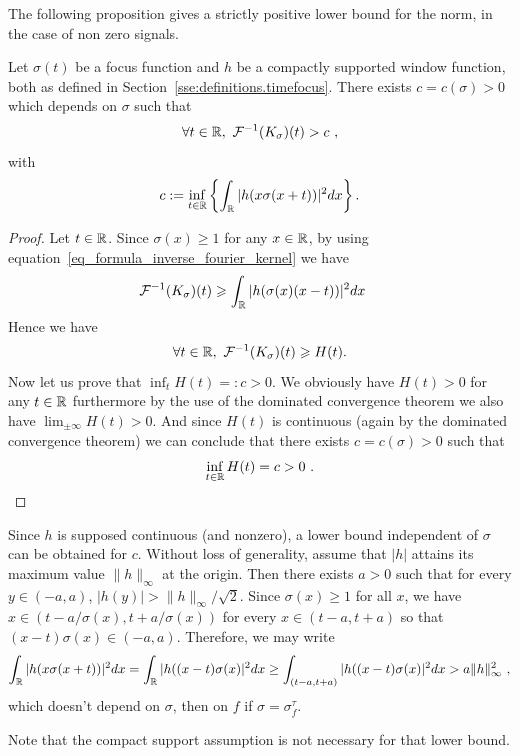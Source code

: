 The following proposition gives a strictly positive lower bound for the norm, in the case of non zero signals.
\begin{prop}\label{prop_lower_bound_control_time_variance}
	Let $\sigma(t)$ be a focus function and $h$ be a compactly supported window function, both as defined in Section~\ref{sse:definitions.timefocus}. There exists $c=c(\sigma)>0$ which depends on $\sigma$ such that
	\begin{equation}\label{eq_lower_bound_kernel}
		\forall t\in\mathbb{R}, \ \mathcal{F}^{-1}(K_\sigma)(t) > c\ ,
	\end{equation}
	with
    \begin{equation}
		c:= \inf_{t\in\mathbb{R}}\left\{ \int_{\mathbb{R}}|h(x\sigma(x+t))|^2 dx \right\} .
	\end{equation}
\end{prop}
\begin{proof}
Let $t\in\mathbb{R}$. Since $\sigma(x)\geqslant1$ for any $x\in\mathbb{R}$, by using equation~\eqref{eq_formula_inverse_fourier_kernel} we have
\begin{align*}
    \mathcal{F}^{-1}(K_\sigma)(t) & \geqslant \int_{\mathbb{R}} |h(\sigma(x)(x-t))|^2 dx
\end{align*}
Hence we have
\begin{equation}
    \forall t\in\R, \ \mathcal{F}^{-1}(K_\sigma)(t)\geqslant H(t).
\end{equation}
Now let us prove that $\inf_t H(t) =: c >0$. We obviously have $H(t)>0$ for any $t\in\mathbb{R}$ furthermore by the use of the dominated convergence theorem we also have $\lim_{\pm\infty}H(t)>0$. And since $H(t)$ is continuous (again by the dominated convergence theorem) we can conclude that there exists $c=c(\sigma)>0$ such that
\begin{equation}
    \inf_{t\in\R}H(t)=c>0\ .
\end{equation}
\end{proof}

\begin{remark}
Since $h$ is supposed continuous (and nonzero), a lower bound independent of $\sigma$ can be obtained for $c$. Without loss of generality, assume that $|h|$ attains its maximum value $\|h\|_\infty$ at the origin. Then there exists $a>0$ such that for every $y\in (-a,a)$, $|h(y)|>  \|h\|_\infty/\sqrt{2}$. Since $\sigma(x)\geqslant 1$ for all $x$, we have $x\in (t-a/\sigma(x),t+a/\sigma(x))$ for every $x\in (t-a,t+a)$ so that $(x-t)\sigma(x)\in (-a,a)$. Therefore, we may write
\[
\int_{\mathbb{R}} |h(x\sigma(x+t))|^2dx = \int_{\mathbb{R}} |h((x-t)\sigma(x)|^2dx\ge \int_{(t-a,t+a)}|h((x-t)\sigma(x)|^2dx> a \|h\|_\infty^2\ ,
\]
which doesn't depend on $\sigma$, then on $f$ if $\sigma=\sigma_f^\tau$.

Note that the compact support assumption is not necessary for that lower bound.
\end{remark}

